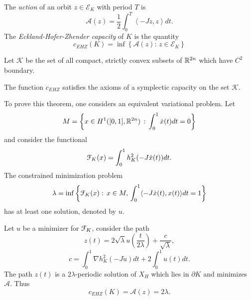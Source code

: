 \documentclass[../capacities_main.tex]{subfiles}
\begin{document}
	\begin{Definition}
		The \emph{action} of an orbit $z \in \mathcal{E}_K$ with period $T$ is
		\begin{equation*}
		\mathcal{A}(z) = \frac{1}{2}\int_{0}^T \left<-J\dot z,z\right> dt.
		\end{equation*}
		The \emph{Eckland-Hofer-Zhender capacity} of $K$ is the quantity
		\begin{equation*}
		c_{EHZ}(K) = \inf\left\{\mathcal{A}(z): \, z\in \mathcal{E}_K\right\}
		\end{equation*}
	\end{Definition}
	Let $\mathcal{K}$ be the set of all compact, strictly convex subsets of ${\mathbb R}^{2n}$ which have $C^2$ boundary.
	\begin{Theorem}
		The function $c_{EHZ}$ satisfies the axioms of a symplectic capacity on the set $\mathcal{K}$.
	\end{Theorem}
	
	To prove this theorem, one considers an equivalent variational problem. Let 
	\begin{equation*}
	M = \left\{ x\in H^{1}([0,1],{\mathbb R}^{2n})\,:\, \int_0^1 \dot x(t)dt = 0\right\}
	\end{equation*}
	and consider the functional 
	\begin{equation} \label{eq:functional}
	{\mathcal F}_K(x) = \int_0^1h_K^2(-J\dot x(t))dt.
	\end{equation}
	The constrained minimization problem 
	\begin{equation}\label{MinProblem}
	\lambda = \inf\left\{ {\mathcal F}_K(x) : \, x\in M,\, \int_0^1\langle -J\dot x(t),x(t)\rangle dt = 1\right\}
	\end{equation}
	has at least one solution, denoted by $u$. 
	
	\begin{Proposition}
		Let $u$ be a minimizer for ${\mathcal F}_K$, consider the path 
		\begin{equation}
		z(t) = 2\sqrt{\lambda} u\left(\frac{t}{2\lambda}\right) + \frac{c}{\sqrt{\lambda}},
		\end{equation}
		\begin{equation}
		c=\int_0^1 \nabla h_K^2(-J\dot u)dt + 2\int_0^1 u(t) dt.
		\end{equation}
		The path $z(t)$ is a $2\lambda$-periodic solution of $X_H$ which lies in $\partial K$ and minimizes $\mathcal{A}$. Thus
		\begin{equation*}
		c_{EHZ}(K)  = \mathcal{A}(z) = 2\lambda.
		\end{equation*}
	\end{Proposition}
	
\end{document}
